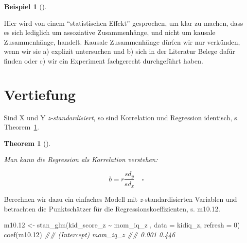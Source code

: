 \documentclass[
  ngerman,
  letterpaper,
  twoside,
  open=any]{scrbook}
\newenvironment{Shaded}{\begin{snugshade}}{\end{snugshade}}
\newcommand{\AttributeTok}[1]{\textcolor[rgb]{0.40,0.45,0.13}{#1}}
\newcommand{\DecValTok}[1]{\textcolor[rgb]{0.68,0.00,0.00}{#1}}
\newcommand{\DocumentationTok}[1]{\textcolor[rgb]{0.37,0.37,0.37}{\textit{#1}}}
\newcommand{\FloatTok}[1]{\textcolor[rgb]{0.68,0.00,0.00}{#1}}
\newcommand{\FunctionTok}[1]{\textcolor[rgb]{0.28,0.35,0.67}{#1}}
\newcommand{\NormalTok}[1]{\textcolor[rgb]{0.00,0.23,0.31}{#1}}
\newcommand{\OtherTok}[1]{\textcolor[rgb]{0.00,0.23,0.31}{#1}}
\newcommand{\SpecialCharTok}[1]{\textcolor[rgb]{0.37,0.37,0.37}{#1}}
\theoremstyle{definition}
\newtheorem{example}{Beispiel}[chapter]
\theoremstyle{plain}
\newtheorem{theorem}{Theorem}[chapter]
\theoremstyle{definition}
\theoremstyle{definition}
\theoremstyle{remark}
\begin{document}
\begin{example}[]
\begin{tcolorbox}[enhanced jigsaw, arc=.35mm, bottomrule=.15mm, bottomtitle=1mm, breakable, colback=white, colbacktitle=quarto-callout-important-color!10!white, colframe=quarto-callout-important-color-frame, coltitle=black, left=2mm, leftrule=.75mm, opacityback=0, opacitybacktitle=0.6, rightrule=.15mm, title=\textcolor{quarto-callout-important-color}{\faExclamation}\hspace{0.5em}{Wichtig}, titlerule=0mm, toprule=.15mm, toptitle=1mm]

Hier wird von einem \enquote{statistischen Effekt} gesprochen, um klar
zu machen, dass es sich lediglich um assoziative Zusammenhänge, und
nicht um kausale Zusammenhänge, handelt. Kausale Zusammenhänge dürfen
wir nur verkünden, wenn wir sie a) explizit untersuchen und b) sich in
der Literatur Belege dafür finden oder c) wir ein Experiment fachgerecht
durchgeführt haben.

\end{tcolorbox}

\section{Vertiefung}\label{vertiefung-4}

Sind X und Y \emph{z-standardisiert}, so sind Korrelation und Regression
identisch, s. Theorem~\ref{thm-br}.

\begin{theorem}[]\protect\hypertarget{thm-br}{}\label{thm-br}

Man kann die Regression als Korrelation verstehen:

\[b = r \frac{sd_y}{sd_x}\quad \square\]

\end{theorem}

Berechnen wir dazu ein einfaches Modell mit \emph{z}-standardisierten
Variablen und betrachten die Punktschätzer für die
Regressionskoeffizienten, s. m10.12.

\begin{Shaded}
\begin{Highlighting}[]
\NormalTok{m10}\FloatTok{.12} \OtherTok{\textless{}{-}} 
  \FunctionTok{stan\_glm}\NormalTok{(kid\_score\_z }\SpecialCharTok{\textasciitilde{}}\NormalTok{ mom\_iq\_z , }\AttributeTok{data =}\NormalTok{ kidiq\_z, }\AttributeTok{refresh =} \DecValTok{0}\NormalTok{)}
\FunctionTok{coef}\NormalTok{(m10}\FloatTok{.12}\NormalTok{)}
\DocumentationTok{\#\# (Intercept)    mom\_iq\_z }
\DocumentationTok{\#\#       0.001       0.446}
\end{Highlighting}
\end{Shaded}


\end{example}
\end{document}
